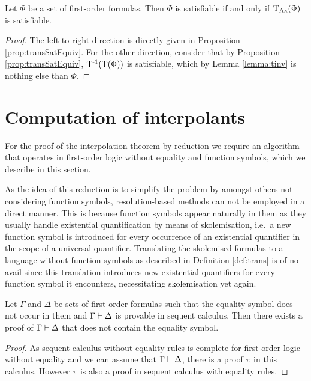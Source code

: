 \begin{corr}
	Let $\Phi$ be a set of first-order formulas.
	Then $\Phi$ is satisfiable if and only if $\operatorname{\operatorname{T}_{Ax}}(\Phi)$ is satisfiable.
\end{corr}
\begin{proof}
	The left-to-right direction is directly given in Proposition \ref{prop:transSatEquiv}.
	For the other direction, consider that by Proposition \ref{prop:transSatEquiv}, $\operatorname{T^{-1}}(\operatorname{T}(\Phi))$ is satisfiable, which by Lemma \ref{lemma:tinv} is nothing else than $\Phi$.
\end{proof}



\section{Computation of interpolants}

For the proof of the interpolation theorem by reduction we require an algorithm that operates in first-order logic without equality and function symbols, which we describe in this section.

\begin{remark}
	As the idea of this reduction is to simplify the problem by amongst others not considering function symbols,
	resolution-based methods can not be employed in a direct manner.
	This is because function symbols appear naturally in them as they usually handle existential quantification by means of skolemisation, i.e.~a new function symbol is introduced for every occurrence of an existential quantifier in the scope of a universal quantifier.
	Translating the skolemised formulas to a language without function symbols as described in Definition \ref{def:trans} is of no avail since this translation introduces new existential quantifiers for every function symbol it encounters, necessitating skolemisation yet again.
\end{remark}


\begin{lemma}
	\label{lemma:no_equality_in_proof}
	 Let $\Gamma$ and $\Delta$ be sets of first-order formulas such that the equality symbol does not occur in them and $\Gamma \vdash \Delta$ is provable in sequent calculus. 
	 Then there exists a proof of $\Gamma \vdash \Delta$ that does not contain the equality symbol.
\end{lemma}
\begin{proof}
	As sequent calculus without equality rules is complete for first-order logic without equality and we can assume that $\Gamma \vdash \Delta$, there is a proof $\pi$ in this calculus.
	However $\pi$ is also a proof in sequent calculus with equality rules.
\end{proof}

